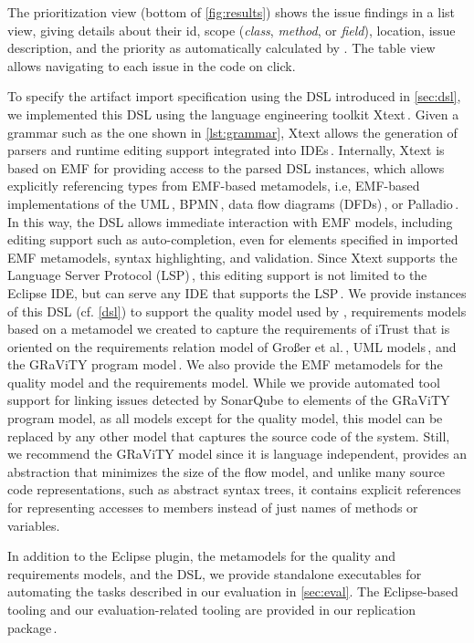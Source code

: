 The prioritization view (bottom of \autoref{fig:results}) shows the issue findings in a list view, giving details about their id, scope (\emph{class}, \emph{method}, or \emph{field}), location, issue description, and the priority as automatically calculated by \appr.
The table view allows navigating to each issue in the code on click.
%

To specify the artifact import specification using the DSL introduced in \autoref{sec:dsl}, we implemented this DSL using the language engineering toolkit  Xtext\,\cite{xtext}.
Given a grammar such as the one shown in \autoref{lst:grammar}, Xtext allows the generation of parsers and runtime editing support integrated into IDEs\,\cite{BPA+2022}.
Internally, Xtext is based on EMF for providing access to the parsed DSL instances, which allows explicitly referencing types from EMF-based metamodels, i.e, EMF-based implementations of the UML\,\cite{Gerard2007}, BPMN\,\cite{EclipseBPMN}, data flow diagrams (DFDs)\,\cite{Tuma2019}, or Palladio\,\cite{reussner2011palladio}.
In this way, the DSL allows immediate interaction with EMF models, including editing support such as auto-completion, even for elements specified in imported EMF metamodels, syntax highlighting, and validation.
Since Xtext supports the Language Server Protocol (LSP)\,\cite{lsp}, this editing support is not limited to the Eclipse IDE, but can serve any IDE that supports the LSP\,\cite{BPA+2022}.
We provide instances of this DSL (cf. \autoref{dsl}) to support the quality model used by \appr{}, requirements models based on a metamodel we created to capture the requirements of iTrust that is oriented on the requirements relation model of Großer et al.\,\cite{Grosser2022RDR}, UML models\,\cite{uml}, and the GRaViTY program model\,\cite{gravity,Peldszus2022}.
We also provide the EMF metamodels for the quality model and the requirements model.
While we provide automated tool support for linking issues detected by SonarQube to elements of the GRaViTY program model, as all models except for the quality model, this model can be replaced by any other model that captures the source code of the system.
Still, we recommend the GRaViTY model since it is language independent, provides an abstraction that minimizes the size of the flow model, and unlike many source code representations, such as abstract syntax trees, it contains explicit references for representing accesses to members instead of just names of methods or variables.

In addition to the Eclipse plugin, the metamodels for the quality and requirements models, and the DSL, we provide standalone executables for automating the tasks described in our evaluation in \autoref{sec:eval}.
The Eclipse-based tooling and our evaluation-related tooling are provided in our replication package\,\cite{replication}.

